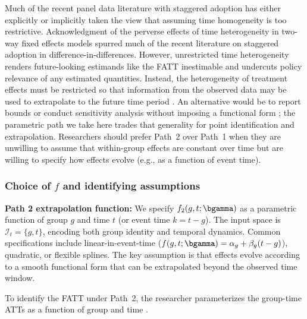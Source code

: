 \documentclass{article}
\begin{document}
Much of the recent panel data literature with staggered adoption has either explicitly \citep{sunEstimatingDynamicTreatment2021,wangAdvancesDifferenceindifferencesMethods2024a,brownDynamicTreatmentEffect2025} or implicitly \citep{stockIdentificationEstimationDynamic2018} taken the view that assuming time homogeneity is too restrictive. Acknowledgment of the perverse effects of time heterogeneity in two-way fixed effects models \citep{sunEstimatingDynamicTreatment2021,wangAdvancesDifferenceindifferencesMethods2024a} spurred much of the recent literature on staggered adoption in difference-in-differences. However, unrestricted time heterogeneity renders future-looking estimands like the FATT inestimable and undercuts policy relevance of any estimated quantities. Instead, the heterogeneity of treatment effects must be restricted so that information from the observed data may be used to extrapolate to the future time period \citep{khosrowiExtrapolationCausalEffects2019,khosrowiExtrapolatingExperimentsConfidently2023,maebaExtrapolationTreatmentEffect2024}. An alternative would be to report bounds or conduct sensitivity analysis without imposing a functional form \citep{manskiPublicPolicyUncertain2013}; the parametric path we take here trades that generality for point identification and extrapolation. Researchers should prefer Path~2 over Path~1 when they are unwilling to assume that within-group effects are constant over time but are willing to specify how effects evolve (e.g., as a function of event time).

\subsubsection{Choice of $f$ and identifying assumptions}

\textbf{Path 2 extrapolation function:} We specify $f_2(g, t; \bgamma)$ as a parametric function of group $g$ and time $t$ (or event time $k = t - g$). The input space is $\mathcal{I}_t = \{g, t\}$, encoding both group identity and temporal dynamics. Common specifications include linear-in-event-time ($f(g,t;\bgamma) = \alpha_g + \beta_g (t-g)$), quadratic, or flexible splines. The key assumption is that effects evolve according to a smooth functional form that can be extrapolated beyond the observed time window.

To identify the FATT under Path~2, the researcher parameterizes the group-time ATTs as a function of group and time \citep{brownDynamicTreatmentEffect2025,maebaExtrapolationTreatmentEffect2024}.
\end{document}
